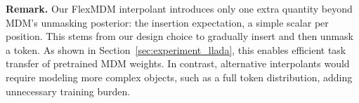 \textbf{Remark.}
Our FlexMDM interpolant introduces only one extra quantity beyond MDM's unmasking posterior: the insertion expectation, a simple scalar per position. This stems from our design choice to gradually insert and then unmask a token. As shown in Section~\ref{sec:experiment_llada}, this enables efficient task transfer of pretrained MDM weights. In contrast, alternative interpolants would require modeling more complex objects, such as a full token distribution, adding unnecessary training burden.
